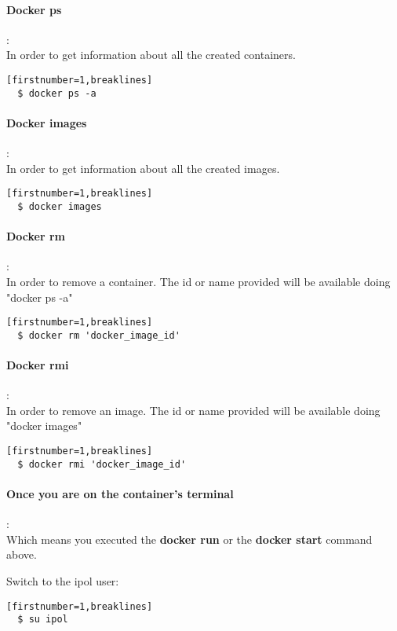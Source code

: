 \documentclass[a4paper,12pt]{article}
\begin{document}
\paragraph{Docker ps}:\\
In order to get information about all the created containers.
\begin{verbatim}[firstnumber=1,breaklines]
  $ docker ps -a
\end{verbatim}

\paragraph{Docker images}:\\
In order to get information about all the created images.
\begin{verbatim}[firstnumber=1,breaklines]
  $ docker images
\end{verbatim}

\paragraph{Docker rm}:\\
In order to remove a container. The id or name provided will be available doing "docker ps -a"
\begin{verbatim}[firstnumber=1,breaklines]
  $ docker rm 'docker_image_id'
\end{verbatim}

\paragraph{Docker rmi}:\\
In order to remove an image. The id or name provided will be available doing "docker images"
\begin{verbatim}[firstnumber=1,breaklines]
  $ docker rmi 'docker_image_id'
\end{verbatim}

\paragraph{Once you are on the container's terminal}:\\

Which means you executed the \textbf{docker run} or the \textbf{docker start} command above.

Switch to the ipol user:
\begin{verbatim}[firstnumber=1,breaklines]
  $ su ipol
\end{verbatim}
\end{document}
